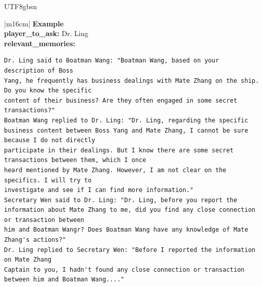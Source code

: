 \documentclass[11pt]{article}
\begin{document}
{\begin{CJK}{UTF8}{gbsn}
\begin{table}[ht!]
\begin{minipage}[t]{\linewidth}
\begin{tabular}{|m{16cm}|}
  \textbf{Example}  \\
 \textbf{  player\_to\_ask:} \small Dr. Ling\\
 \textbf{  relevant\_memories:}\\
 \begin{minipage}[t]{\linewidth}
\small\begin{verbatim}
Dr. Ling said to Boatman Wang: "Boatman Wang, based on your description of Boss
Yang, he frequently has business dealings with Mate Zhang on the ship. Do you know the specific
content of their business? Are they often engaged in some secret transactions?"
Boatman Wang replied to Dr. Ling: "Dr. Ling, regarding the specific
business content between Boss Yang and Mate Zhang, I cannot be sure because I do not directly
participate in their dealings. But I know there are some secret transactions between them, which I once
heard mentioned by Mate Zhang. However, I am not clear on the specifics. I will try to 
investigate and see if I can find more information."
Secretary Wen said to Dr. Ling: "Dr. Ling, before you report the 
information about Mate Zhang to me, did you find any close connection or transaction between
him and Boatman Wangr? Does Boatman Wang have any knowledge of Mate Zhang's actions?"
Dr. Ling replied to Secretary Wen: "Before I reported the information on Mate Zhang
Captain to you, I hadn't found any close connection or transaction between him and Boatman Wang...."

\end{verbatim}
\end{minipage} \\


\end{tabular}
\end{minipage}
\end{table}
\end{CJK}}
\end{document}
